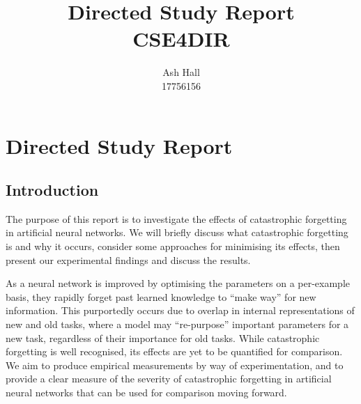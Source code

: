 \documentclass{report}
\title{Directed Study Report\\CSE4DIR}
\author{Ash Hall\\17756156}
\begin{document}
	\maketitle
	\thispagestyle{empty}
	\newpage
	\thispagestyle{empty}
	\tableofcontents
	\newpage
	\thispagestyle{empty}
	\newpage
	
	\setcounter{chapter}{1}	
	\chapter*{Directed Study Report}

	\section{Introduction}
	The purpose of this report is to investigate the effects of catastrophic forgetting in artificial neural networks. We will briefly discuss what catastrophic forgetting is and why it occurs, consider some approaches for minimising its effects, then present our experimental findings and discuss the results. \par \par
	As a neural network is improved by optimising the parameters on a per-example basis, they rapidly forget past learned knowledge to ``make way'' for new information. This purportedly occurs due to overlap in internal representations of new and old tasks, where a model may ``re-purpose'' important parameters for a new task, regardless of their importance for old tasks. While catastrophic forgetting is well recognised, its effects are yet to be quantified for comparison. We aim to produce empirical measurements by way of experimentation, and to provide a clear measure of the severity of catastrophic forgetting in artificial neural networks that can be used for comparison moving forward. \par
	
\end{document}
